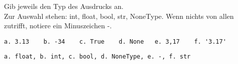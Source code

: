 \question[3]
Gib jeweils den Typ des Ausdrucks an. \\
Zur Auswahl stehen: int, float, bool, str, NoneType. Wenn nichts von allen zutrifft, notiere
ein Minuszeichen -.
\begin{lstlisting}
a. 3.13    b. -34    c. True    d. None   e. 3,17    f. '3.17'
\end{lstlisting}
\begin{solutionbox}{2cm}
\begin{lstlisting}
a. float, b. int, c. bool, d. NoneType, e. -, f. str
\end{lstlisting}
\end{solutionbox}

